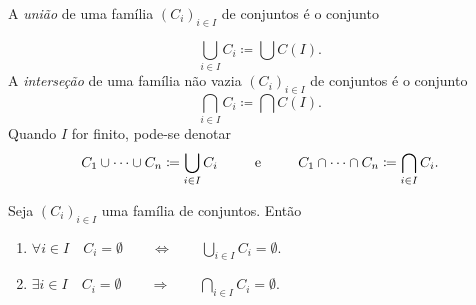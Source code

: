 \begin{defi}
A \emph{união} de uma família $(C_i)_{i \in I}$ de conjuntos é o conjunto
\end{defi}
	\begin{equation*}
	\bigcup_{i \in I} C_i \coloneqq \bigcup C(I).
	\end{equation*}
A \emph{interseção} de uma família não vazia $(C_i)_{i \in I}$ de conjuntos é o conjunto
	\begin{equation*}
	\bigcap_{i \in I} C_i \coloneqq \bigcap C(I).
	\end{equation*}
\noindent
Quando $I$ for finito, pode-se denotar
	\begin{equation*}
	C_1 \cup \cdots \cup C_n \coloneqq \bigcup_{i \in I} C_i \qquad \e \qquad C_1 \cap \cdots \cap C_n \coloneqq \bigcap_{i \in I} C_i.
	\end{equation*}
	
\begin{prop}
	Seja $(C_i)_{i \in I}$ uma família de conjuntos. Então
	\begin{enumerate}
	\item $\forall i \in I \quad C_i = \emptyset \qquad \Leftrightarrow \qquad \displaystyle \bigcup_{i \in I} C_i = \emptyset$.
	
	\item $\displaystyle \exists i \in I \quad C_i = \emptyset \qquad \Rightarrow \qquad \bigcap_{i \in I} C_i = \emptyset$.
	\end{enumerate}
\end{prop}

